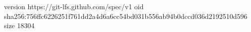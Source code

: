 version https://git-lfs.github.com/spec/v1
oid sha256:756ffc6226251f761dd2a4d6a6cc54bd031b556ab94b0dccd036d2192510d596
size 18304
